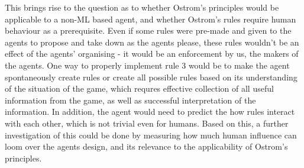 This brings rise to the question as to whether Ostrom’s principles would be applicable to a non-ML based agent, and whether Ostrom’s rules require human behaviour as a prerequisite. Even if some rules were pre-made and given to the agents to propose and take down as the agents please, these rules wouldn't be an effect of the agents' organising - it would be an enforcement by us, the makers of the agents. One way to properly implement rule 3 would be to make the agent spontaneously create rules or create all possible rules based on its understanding of the situation of the game, which requres effective collection of all useful information from the game, as well as successful interpretation of the information. In addition, the agent would need to predict the how rules interact with each other, which is not trivial even for humans. Based on this, a further investigation of this could be done by measuring how much human influence can loom over the agents design, and its relevance to the applicability of Ostrom’s principles.
